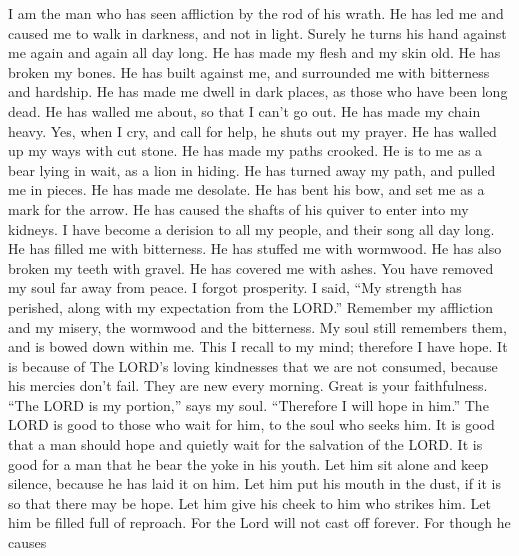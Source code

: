  I am the man who has seen affliction by the rod of his
wrath.  He has led me and caused me to walk in darkness,
and not in light.  Surely he turns his hand against me
again and again all day long.  He has made my flesh and my
skin old. He has broken my bones.  He has built against
me, and surrounded me with bitterness and hardship.  He
has made me dwell in dark places, as those who have been long dead.
 He has walled me about, so that I can't go out. He has
made my chain heavy.  Yes, when I cry, and call for help,
he shuts out my prayer.  He has walled up my ways with cut
stone. He has made my paths crooked.  He is to me as a
bear lying in wait, as a lion in hiding.  He has turned
away my path, and pulled me in pieces. He has made me desolate.
 He has bent his bow, and set me as a mark for the arrow.
 He has caused the shafts of his quiver to enter into my
kidneys.  I have become a derision to all my people, and
their song all day long.  He has filled me with
bitterness. He has stuffed me with wormwood.  He has also
broken my teeth with gravel. He has covered me with ashes.
 You have removed my soul far away from peace. I forgot
prosperity.  I said, ``My strength has perished, along
with my expectation from the LORD.''  Remember my
affliction and my misery, the wormwood and the bitterness.
 My soul still remembers them, and is bowed down within
me.  This I recall to my mind; therefore I have hope.
 It is because of The LORD's loving kindnesses that we
are not consumed, because his mercies don't fail.  They
are new every morning. Great is your faithfulness.  ``The
LORD is my portion,'' says my soul. ``Therefore I will hope in him.''
 The LORD is good to those who wait for him, to the soul
who seeks him.  It is good that a man should hope and
quietly wait for the salvation of the LORD.  It is good
for a man that he bear the yoke in his youth.  Let him
sit alone and keep silence, because he has laid it on him.
 Let him put his mouth in the dust, if it is so that
there may be hope.  Let him give his cheek to him who
strikes him. Let him be filled full of reproach.  For the
Lord will not cast off forever.  For though he causes
